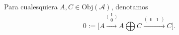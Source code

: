\documentclass[preview]{standalone}
\begin{document}
\begin{center}
Para cualesquiera $A,C\in\text{Obj}(\mathscr{A})$, denotamos $$0:= \big[ A \xrightarrow{\big(\begin{smallmatrix}1 \\ 0\end{smallmatrix}\big)} A\bigoplus C \xrightarrow{(\begin{smallmatrix} 0 &1 \end{smallmatrix})} C \big].$$
\end{center}
\end{document}

